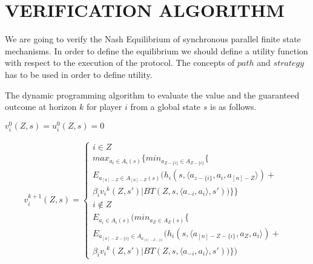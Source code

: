 
 

 

\section{VERIFICATION ALGORITHM}
\label{sec: verification_algo}
We are going to verify the Nash Equilibrium of synchronous parallel finite state mechanisms. In order to define the equilibrium we should define a utility function with respect to the execution of the protocol. The concepts of $path$ and $strategy$ has to be used in order to define utility.



The dynamic programming algorithm to evaluate the value and the guaranteed outcome at horizon $k$ for player $i$ from a global state $s$ is as follows.


$v_{i}^{0}(Z,s) = u_{i}^{0}(Z,s) =0 $ \cite{MMS08} \newline

\begin{equation}
\begin{split}
v_{i}^{k+1}(Z,s)=
\begin{cases}
i \in Z &
\\max _{a_i \in A_i(s)}\{
min_{a_{Z-\{i\}} \in A_{Z-\{i\}}}\{
\\E_{a_{[n]-Z} \in A_{[n]-Z}(s)} (h_i(s,\langle a_{z-\{i\}},a_i,a_{[n]-Z} \rangle) +\\ \beta_i{v_i}^{k}(Z,s') | BT(Z,s,\langle a_{-i},a_i \rangle,s')  ) \} \}\\
i \notin Z &
\\E_{a_i \in A_i(s)}(min _{a_{Z} \in A_{Z}(s)}\{
\\E_{a_{[n]-Z-\{i\}} \in A_{a_{[n]-Z-\{i\}}}}( h_i(s,\langle a_{[n]-Z-\{i\}},a_{Z},a_i \rangle) +\\ \beta_i{v_i}^{k}(Z,s') | BT(Z,s,\langle a_{-i},a_i \rangle,s') )\} ) 
\end{cases}
\end{split}
\end{equation}

